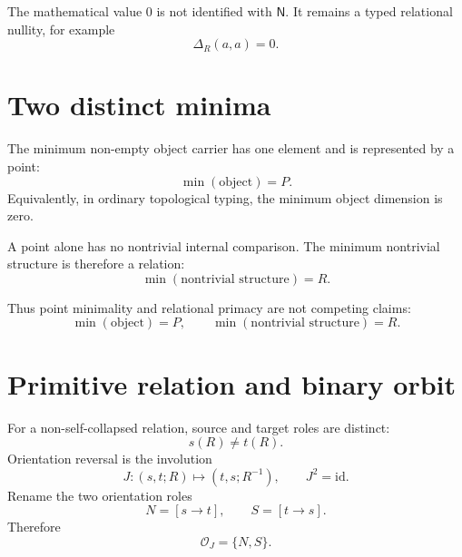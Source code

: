 The mathematical value $0$ is not identified with $\mathsf N$. It remains a typed relational nullity, for example
\begin{equation}
\Delta_R(a,a)=0.
\end{equation}

\section{Two distinct minima}

The minimum non-empty object carrier has one element and is represented by a point:
\begin{equation}
\boxed{\min(\text{object})=P.}
\label{eq:v12_point_minimality}
\end{equation}
Equivalently, in ordinary topological typing, the minimum object dimension is zero.

A point alone has no nontrivial internal comparison. The minimum nontrivial structure is therefore a relation:
\begin{equation}
\boxed{\min(\text{nontrivial structure})=R.}
\label{eq:v12_relation_minimality}
\end{equation}

Thus point minimality and relational primacy are not competing claims:
\begin{equation}
\boxed{
\min(\text{object})=P,
\qquad
\min(\text{nontrivial structure})=R.
}
\end{equation}

\section{Primitive relation and binary orbit}

For a non-self-collapsed relation, source and target roles are distinct:
\begin{equation}
s(R)\neq t(R).
\end{equation}
Orientation reversal is the involution
\begin{equation}
J:(s,t;R)\mapsto(t,s;R^{-1}),
\qquad
J^2=\mathrm{id}.
\end{equation}
Rename the two orientation roles
\begin{equation}
\boxed{N=[s\to t],\qquad S=[t\to s].}
\end{equation}
Therefore
\begin{equation}
\boxed{\mathcal O_J=\{N,S\}.}
\label{eq:v12_binary_orbit}
\end{equation}

